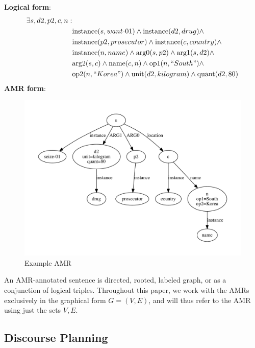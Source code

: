 \documentclass[12pt]{article}
\begin{document}
\noindent \textbf{Logical form}:
\begin{equation}
\begin{split}
\exists s,d2,p2,c,n: &\\
&\text{instance}(s,want\text{-}01) \wedge \text{instance}(d2, drug) \wedge \\
&\text{instance}(p2, prosecutor) \wedge \text{instance}(c, country) \wedge \\
&\text{instance}(n, name) \wedge \text{arg0}(s,p2) \wedge \text{arg1}(s,d2)
\wedge \\ &\text{arg2}(s,c) \wedge \text{name}(c,n) \wedge \text{op1}(n,
``South") \wedge \\ &\text{op2}(n, ``Korea") \wedge \text{unit}(d2, kilogram)
\wedge \text{quant}(d2, 80)
\end{split}
\end{equation}
\textbf{AMR form}:
\begin{figure}
\includegraphics[width=\linewidth]{amr_example.pdf}
\caption{Example AMR}
\label{fig:amr_example}
\end{figure}

An AMR-annotated sentence is directed, rooted, labeled graph, or as a
conjunction of logical triples. Throughout this paper, we work with the AMRs
exclusively in the graphical form $G=(V,E)$, and will thus refer to the AMR
using just the sets $V,E$.

\subsection{Discourse Planning}
\end{document}
